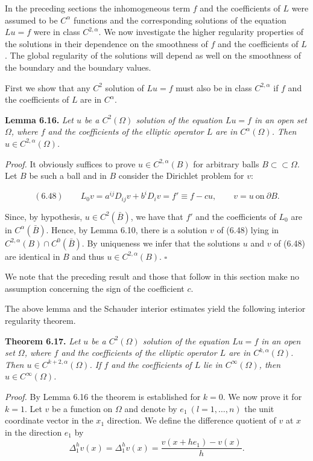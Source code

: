 In the preceding sections the inhomogeneous term $f$ and the coefficients of $L$ were assumed to be $C^\alpha$ functions and the corresponding solutions of the equation $Lu=f$ were in class $C^{2,\alpha}$. We now investigate the higher regularity properties of the solutions in their dependence on the smoothness of $f$ and the coefficients of $L$. The global regularity of the solutions will depend as well on the smoothness of the boundary and the boundary values.

First we show that any $C^2$ solution of $Lu=f$ must also be in class $C^{2,\alpha}$ if $f$ and the coefficients of $L$ are in $C^\alpha$.

\textbf{Lemma 6.16.} \emph{Let $u$ be a $C^2(\Omega)$ solution of the equation $Lu=f$ in an open set $\Omega$, where $f$ and the coefficients of the elliptic operator $L$ are in $C^\alpha(\Omega)$. Then $u\in C^{2,\alpha}(\Omega)$.}

\emph{Proof.} It obviously suffices to prove $u\in C^{2,\alpha}(B)$ for arbitrary balls $B\subset\subset\Omega$. Let $B$ be such a ball and in $B$ consider the Dirichlet problem for $v$:

\[
(6.48)\qquad L_0v=a^{ij}D_{ij}v+b^iD_iv=f' \equiv f-cu,\qquad v=u\ \text{on}\ \partial B.
\]

Since, by hypothesis, $u\in C^2(\bar B)$, we have that $f'$ and the coefficients of $L_0$ are in $C^\alpha(\bar B)$. Hence, by Lemma 6.10, there is a solution $v$ of (6.48) lying in $C^{2,\alpha}(B)\cap C^0(\bar B)$. By uniqueness we infer that the solutions $u$ and $v$ of (6.48) are identical in $B$ and thus $u\in C^{2,\alpha}(B)$. $\square$

We note that the preceding result and those that follow in this section make no assumption concerning the sign of the coefficient $c$.

The above lemma and the Schauder interior estimates yield the following interior regularity theorem.

\textbf{Theorem 6.17.} \emph{Let $u$ be a $C^2(\Omega)$ solution of the equation $Lu=f$ in an open set $\Omega$, where $f$ and the coefficients of the elliptic operator $L$ are in $C^{k,\alpha}(\Omega)$. Then $u\in C^{k+2,\alpha}(\Omega)$. If $f$ and the coefficients of $L$ lie in $C^\infty(\Omega)$, then $u\in C^\infty(\Omega)$.}

\emph{Proof.} By Lemma 6.16 the theorem is established for $k=0$. We now prove it for $k=1$. Let $v$ be a function on $\Omega$ and denote by $e_1\ (l=1,\ldots,n)$ the unit coordinate vector in the $x_1$ direction. We define the difference quotient of $v$ at $x$ in the direction $e_1$ by
\[
\Delta_1^h v(x)=\Delta_1^h v(x)=\frac{v(x+he_1)-v(x)}{h}.
\]

